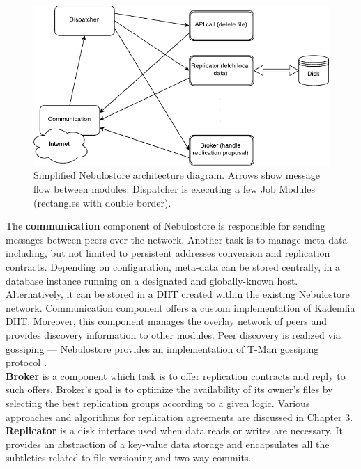 \documentclass{pracamgren}
\begin{document}
\begin{figure}[h]
\centering
\includegraphics[scale=1.25]{arch.pdf}
\caption{Simplified Nebulostore architecture diagram. Arrows show message flow between modules. Dispatcher is executing a few Job Modules (rectangles with double border).}
\end{figure}

The {\bf communication} component of Nebulostore is responsible for sending messages between peers over the network. Another task is to manage meta-data including, but not limited to persistent addresses conversion and replication contracts. Depending on configuration, meta-data can be stored centrally, in a database instance running on a designated and globally-known host. Alternatively, it can be stored in a DHT created within the existing Nebulostore network. Communication component offers a custom implementation of Kademlia \cite{kademlia} DHT. Moreover, this component manages the overlay network of peers and provides discovery information to other modules. Peer discovery is realized via gossiping \cite{gossiping} --- Nebulostore provides an implementation of T-Man gossiping protocol \cite{tman}.\\

{\bf Broker} is a component which task is to offer replication contracts and reply to such offers. Broker's goal is to optimize the availability of its owner's files by selecting the best replication groups according to a given logic. Various approaches and algorithms for replication agreements are discussed in Chapter 3.\\

{\bf Replicator} is a disk interface used when data reads or writes are necessary. It provides an abstraction of a key-value data storage and encapsulates all the subtleties related to file versioning and two-way commits.\\
\end{document}
